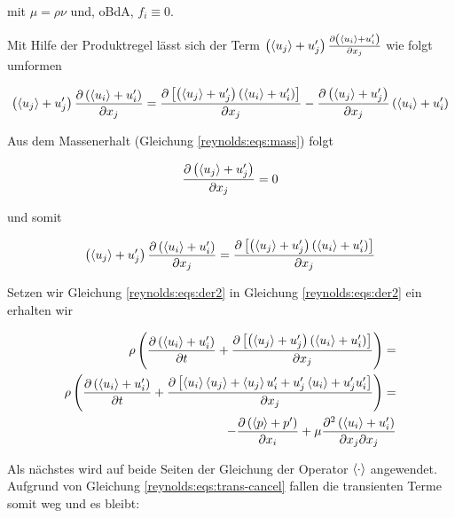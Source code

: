 mit $\mu = \rho \nu$ und, oBdA, $f_i \equiv 0$.

Mit Hilfe der Produktregel lässt sich der Term $\left( \left\langle u_j \right\rangle + u_j' \right) \frac{\partial \left( \left\langle u_i \right\rangle + u_i' \right)}{\partial x_j}$
wie folgt umformen

\begin{equation}
    \left( \left\langle u_j \right\rangle + u_j' \right) \frac{\partial \left( \left\langle u_i \right\rangle + u_i' \right)}{\partial x_j} =
        \frac{\partial \left[ \left( \left\langle u_j \right\rangle + u_j' \right) \left( \left\langle u_i \right\rangle + u_i' \right) \right]}{\partial x_j}
        - \frac{\partial \left( \left\langle u_j \right\rangle + u_j' \right)}{\partial x_j} \left( \left\langle u_i \right\rangle + u_i' \right)
\end{equation}

Aus dem Massenerhalt (Gleichung \ref{reynolds:eqs:mass}) folgt

\begin{equation}
    \frac{\partial \left( \left\langle u_j \right\rangle + u_j' \right)}{\partial x_j} = 0
\end{equation}

und somit

\begin{equation}
    \label{reynolds:eqs:der2}
    \left( \left\langle u_j \right\rangle + u_j' \right) \frac{\partial \left( \left\langle u_i \right\rangle + u_i' \right)}{\partial x_j} =
        \frac{\partial \left[ \left( \left\langle u_j \right\rangle + u_j' \right) \left( \left\langle u_i \right\rangle + u_i' \right) \right]}{\partial x_j}
\end{equation}

Setzen wir Gleichung \ref{reynolds:eqs:der2} in Gleichung \ref{reynolds:eqs:der2} ein erhalten wir

\begin{align}
    \rho \left(
            \frac{\partial \left( \left\langle u_i \right\rangle + u_i' \right)}{\partial t} +
            \frac{\partial \left[ \left( \left\langle u_j \right\rangle + u_j' \right) \left( \left\langle u_i \right\rangle + u_i' \right) \right]}{\partial x_j}
        \right) = \\
    \rho \left(
            \frac{\partial \left( \left\langle u_i \right\rangle + u_i' \right)}{\partial t} +
            \frac{\partial \left[ \left\langle u_i \right\rangle \left\langle u_j \right\rangle  + \left\langle u_j \right\rangle u_i' + u_j' \left\langle u_i \right\rangle + u_j' u_i'\right]}{\partial x_j}
        \right) = \\
    - \frac{\partial \left( \left\langle p \right\rangle + p' \right)}{\partial x_i} + 
    \mu \frac{\partial^2 \left( \left\langle u_i \right\rangle + u_i' \right)}{\partial x_j \partial x_j}
\end{align}

Als nächstes wird auf beide Seiten der Gleichung der Operator $\left\langle \cdot \right\rangle$ angewendet.
Aufgrund von Gleichung \ref{reynolds:eqs:trans-cancel} fallen die transienten Terme somit
weg und es bleibt:

